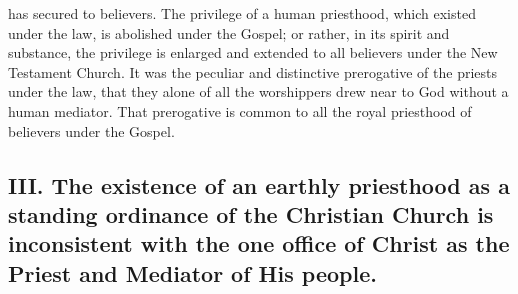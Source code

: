 \documentclass[]{book}
\begin{document}
has secured to believers. The privilege of a human priesthood, which existed under the law, is abolished under the Gospel; or rather, in its spirit and substance, the privilege is enlarged and extended to all believers under the New Testament Church. It was the peculiar and distinctive prerogative of the priests under the law, that they alone of all the worshippers drew near to God without a human mediator. That prerogative is common to all the royal priesthood of believers under the Gospel.

\hypertarget{iii.-the-existence-of-an-earthly-priesthood-as-a-standing-ordinance-of-the-christian-church-is-inconsistent-with-the-one-office-of-christ-as-the-priest-and-mediator-of-his-people.}{%
\subsection{III. The existence of an earthly priesthood as a standing ordinance of the Christian Church is inconsistent with the one office of Christ as the Priest and Mediator of His people.}\label{iii.-the-existence-of-an-earthly-priesthood-as-a-standing-ordinance-of-the-christian-church-is-inconsistent-with-the-one-office-of-christ-as-the-priest-and-mediator-of-his-people.}}
\end{document}
